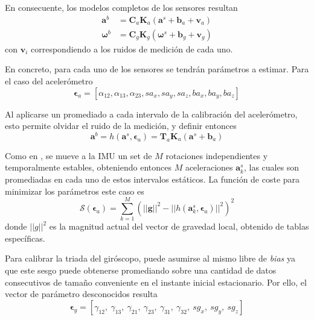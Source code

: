 En consecuente, los modelos completos de los sensores resultan
\begin{align}
    \bm{a}^b &= \bm{C}_a\bm{K}_a\left(\bm{a}^s + \bm{b}_a + \bm{v}_a\right) \\
    \bm{\omega}^b &= \bm{C}_g\bm{K}_g\left(\bm{\omega}^s + \bm{b}_g + \bm{v}_g\right)
\end{align}
con $\bm{v}_i$ correspondiendo a los ruidos de medición de cada uno.

En concreto, para cada uno de los sensores se tendrán parámetros a estimar. Para el caso del acelerómetro
\begin{equation}
    \bm{\epsilon}_{a} = [\alpha_{12},\alpha_{13},\alpha_{23},sa_x,sa_y,sa_z,ba_x,ba_y,ba_z]
    \label{eq:accelcalibrationparams}
\end{equation}

Al aplicarse un promediado a cada intervalo de la calibración del acelerómetro, esto permite olvidar el ruido de la medición, y definir entonces
\begin{equation}
    \bm{a}^b = h(\bm{a}^s,\bm{\epsilon}_{a}) = \bm{T}_a\bm{K}_a(\bm{a}^s+\bm{b}_a)    
\end{equation}

Como en \cite{lotters1998}, se mueve a la IMU un set de $M$ rotaciones independientes y temporalmente estables, obteniendo entonces $M$ aceleraciones $\bm{a}^s_k$, las cuales son promediadas en cada uno de estos intervalos estáticos. La función de coste para minimizar los parámetros este caso es
\begin{equation}
    \mathscr{S}(\bm{\epsilon}_{a}) = \sum_{k=1}^M(||\bm{g}||^2-||h(\bm{a}^s_k,\bm{\epsilon}_{a})||^2)^2
    \label{eq:generalaccelcostfunction}
\end{equation}
donde $||g||^2$ es la magnitud actual del vector de gravedad local, obtenido de tablas específicas.

Para calibrar la triada del giróscopo, puede asumirse al mismo libre de \textit{bias} ya que este sesgo puede obtenerse promediando sobre una cantidad de datos consecutivos de tamaño conveniente en el instante inicial estacionario. Por ello, el vector de parámetro desconocidos resulta
\begin{equation}
    \bm{\epsilon}_{g} = \left[\gamma_{12},\ \gamma_{13},\ \gamma_{21},\ \gamma_{23},\ \gamma_{31},\ \gamma_{32},\ sg_x,\ sg_y,\ sg_z\right]
    \label{eq:gyrocalibrationparams}
\end{equation}

